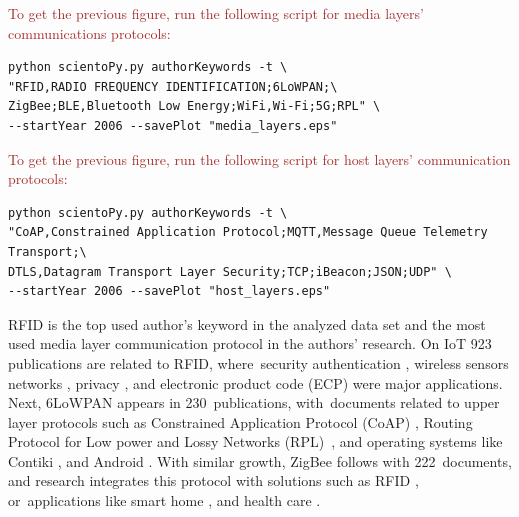 \documentclass[symmetry,article,accept,moreauthors,pdftex10pt,a4paper]{mdpi}
\begin{document}
\noindent
\textcolor{brown}{To get the previous figure, run the following script for media layers' communications protocols:}\\
\begin{verbatim}
python scientoPy.py authorKeywords -t \
"RFID,RADIO FREQUENCY IDENTIFICATION;6LoWPAN;\
ZigBee;BLE,Bluetooth Low Energy;WiFi,Wi-Fi;5G;RPL" \
--startYear 2006 --savePlot "media_layers.eps"
\end{verbatim}

\noindent
\textcolor{brown}{To get the previous figure, run the following script for host layers' communication protocols:}\\
\begin{verbatim}
python scientoPy.py authorKeywords -t \
"CoAP,Constrained Application Protocol;MQTT,Message Queue Telemetry Transport;\
DTLS,Datagram Transport Layer Security;TCP;iBeacon;JSON;UDP" \
--startYear 2006 --savePlot "host_layers.eps"
\end{verbatim}



RFID is the top used author's keyword in the analyzed data set and the most used media layer communication protocol in the authors' research. On IoT 923 publications are related to RFID, where~security authentication \cite{Yuan2016,Li20124971,Li2016}, wireless sensors networks \cite{Hamza2016267,6322530}, privacy \cite{Wu20151224,Burmester2014317}, and electronic product code (ECP) \cite{Yan201255,Xu201140} were major applications. Next, 6LoWPAN appears in 230~publications, with~documents related to upper layer protocols such as Constrained Application Protocol (CoAP) \cite{Castellani201471,Bimschas2012}, Routing Protocol for Low power and Lossy Networks (RPL)~\cite{Pongle2015,Hellaoui201525}, and operating systems like Contiki \cite{Bragg20161273,Caputo2012770}, and Android \cite{Wang201549,Schleiss201214}. With similar growth, ZigBee follows with 222~documents, and research integrates this protocol with solutions such as RFID \cite{Fan2012732,Alharbe2013191,zhang2014}, or~applications like smart home \cite{Yiqi2014114,Yi2016128,wang2013}, and health care \cite{Kodali2016411,Spano20165452,Rosner201444}.
\end{document}
